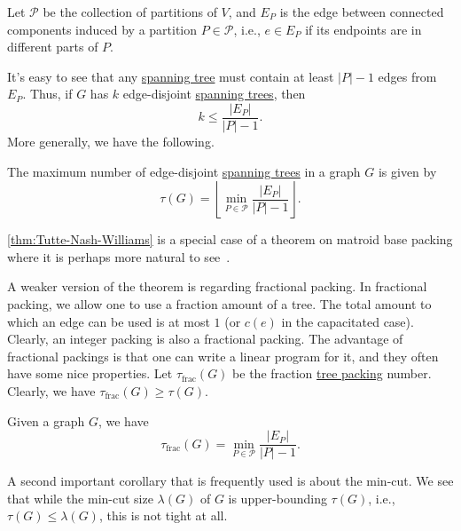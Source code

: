 \begin{notation}
	Let \(\mathcal{P} \) be the collection of partitions of \(V\), and \(E_P\) is the edge between connected components induced by a partition \(P \in \mathcal{P} \), i.e., \(e \in E_P\) if its endpoints are in different parts of \(P\).
\end{notation}

It's easy to see that any \hyperref[def:spanning-tree]{spanning tree} must contain at least \(\lvert P \rvert - 1\) edges from \(E_P\). Thus, if \(G\) has \(k\) edge-disjoint \hyperref[def:spanning-tree]{spanning trees}, then
\[
	k \leq \frac{\lvert E_P \rvert }{\lvert P \rvert - 1}.
\]
More generally, we have the following.

\begin{theorem}\label{thm:Tutte-Nash-Williams}
	The maximum number of edge-disjoint \hyperref[def:spanning-tree]{spanning trees} in a graph \(G\) is given by
	\[
		\tau (G)
		= \left\lfloor \min _{P \in \mathcal{P} } \frac{\lvert E_P \rvert }{\lvert P \rvert - 1} \right\rfloor.
	\]
\end{theorem}

\begin{remark}
	\autoref{thm:Tutte-Nash-Williams} is a special case of a theorem on matroid base packing where it is perhaps more natural to see~\cite{schrijver2003combinatorial}.
\end{remark}

A weaker version of the theorem is regarding fractional packing. In fractional packing, we allow one to use a fraction amount of a tree. The total amount to which an edge can be used is at most \(1\) (or \(c(e)\) in the capacitated case). Clearly, an integer packing is also a fractional packing. The advantage of fractional packings is that one can write a linear program for it, and they often have some nice properties. Let \(\tau _{\text{frac} } (G)\) be the fraction \hyperref[prb:TP]{tree packing} number. Clearly, we have \(\tau _{\text{frac} }(G) \geq \tau (G)\).

\begin{corollary}\label{col:Tutte-Nash-Williams}
	Given a graph \(G\), we have
	\[
		\tau _{\text{frac} } (G)
		= \min _{P \in \mathcal{P} } \frac{\lvert E_P \rvert }{\lvert P \rvert - 1}.
	\]
\end{corollary}

A second important corollary that is frequently used is about the min-cut. We see that while the min-cut size \(\lambda (G)\) of \(G\) is upper-bounding \(\tau (G)\), i.e., \(\tau (G) \leq \lambda (G)\), this is not tight at all.


